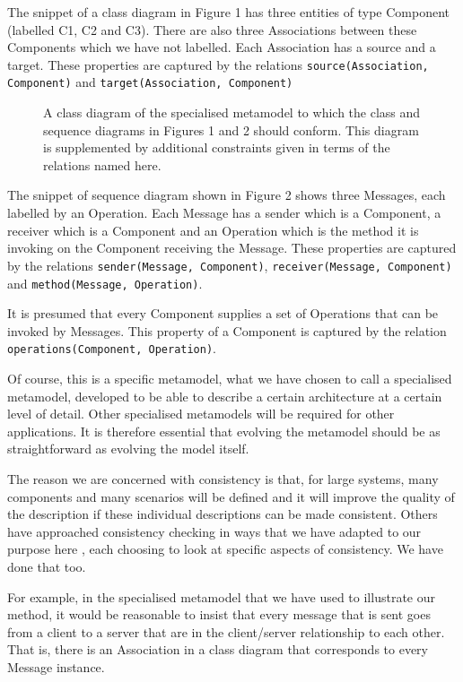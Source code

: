 \documentclass[times, 10pt,twocolumn]{article}
\begin{document}
The snippet of a class diagram in Figure 1 has three entities of type Component (labelled C1, C2 and C3). There are also three Associations between these Components which we have not labelled. Each Association has a source and a target. These properties are captured by the relations {\small\verb$source(Association, Component)$} and {\small\verb$target(Association, Component)$} 
\begin{figure}[h]
  \centering
   {}
   \caption{A class diagram of the specialised metamodel to which the class and sequence diagrams in Figures 1 and 2 should conform. This diagram is supplemented by additional constraints given in terms of the relations named here.}
\end{figure}

The snippet of sequence diagram shown in Figure 2 shows three Messages, each labelled by an Operation. Each Message has a sender which is a Component, a receiver which is a Component and an Operation which is the method it is invoking on the Component receiving the Message. These properties are captured by the relations 
{\small\verb$sender(Message, Component)$}, 
{\small\verb$receiver(Message, Component)$} and 
{\small\verb$method(Message, Operation)$}.

It is presumed that every Component supplies a set of Operations that can be invoked by Messages. This property of a Component is captured by the relation {\small\verb$operations(Component, Operation)$}. 

Of course, this is a specific metamodel, what we have chosen to call a specialised metamodel, developed to be able to describe a certain architecture at a certain level of detail. Other specialised metamodels will be required for other applications. It is therefore essential that evolving the metamodel should be as straightforward as evolving the model itself.


\noindent The reason we are concerned with consistency is that, for large systems, many components and many scenarios will be defined and it will improve the quality of the description if these individual descriptions can be made consistent. Others have approached consistency checking in ways that we have adapted to our purpose here \cite{Gokhale,Crocopat,Crocopat2,Chang,Chang2,Dekel,Holt,Shen}, each choosing to look at specific aspects of consistency. We have done that too.

For example, in the specialised metamodel that we have used to illustrate our method, it would be reasonable to insist that every message that is sent goes from a client to a server that are in the client/server relationship to each other. That is, there is an Association in a class diagram that corresponds to every Message instance.
\end{document}
